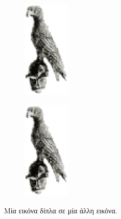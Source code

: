 \begin{figure}[t]
	\centering
	\begin{subfigure}[t]{0.49\textwidth}
		\centering
		\includegraphics[width=0.25\textwidth]{Figures/bird.eps}
		\caption{}
		\label{subfig:TwoBirdsA}
	\end{subfigure}
	\hfill
	\begin{subfigure}[t]{0.49\textwidth}
		\centering
		\includegraphics[width=0.25\textwidth]{Figures/bird.eps}
		\caption{}
		\label{subfig:TwoBirdsB}
	\end{subfigure}
	\caption{Μία εικόνα δίπλα σε μία άλλη εικόνα.}
	\label{fig:TwoBirds}
\end{figure}